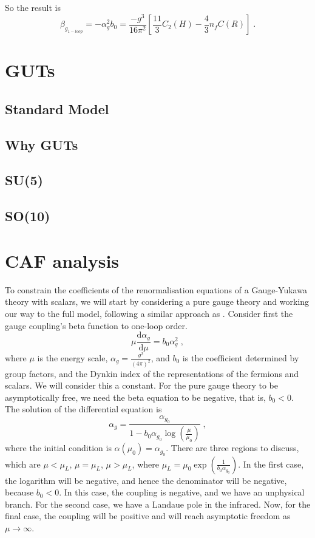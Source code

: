 So the result is
\begin{equation}
    \beta_{g_{1-loop}}=-\alpha_g^2 b_0 =\frac{-g^3}{16\pi^2}\left[ \frac{11}{3}C_2(H)-\frac{4}{3}n_fC(R)\right]\;.\label{eq:betafunction YM 1loop}
\end{equation}

\section{GUTs}
\subsection{Standard Model}
\subsection{Why GUTs}
\subsection{SU(5)}
\subsection{SO(10)}

\section{CAF analysis}
To constrain the coefficients of the renormalisation equations of a Gauge-Yukawa theory with scalars, we will start by considering a pure gauge theory and working our way to the full model, following a similar approach as \cite{Pica2017ConformalPhase}.  
Consider first the gauge coupling's beta function to one-loop order. 
\begin{equation}
    \mu \frac{\text{d}\alpha_g}{\text{d}\mu}=b_0\alpha_g^2\;,\label{eq:betag1loop}
\end{equation}
where $\mu$ is the energy scale, $\alpha_g=\frac{g^2}{(4\pi)^2}$, and $b_0$ is the coefficient determined by group factors, and the Dynkin index of the representations of the fermions and scalars. We will consider this a constant. For the pure gauge theory to be asymptotically free, we need the beta equation to be negative, that is, $b_0<0$. The solution of the differential equation is
\begin{equation}
    \alpha_g=\frac{\alpha_{g_0}}{1-b_0 \alpha_{g_0} \log \left(\frac{\mu}{\mu_0 }\right)}\;,
    \label{eq:solbetag1loop}
\end{equation}
where the initial condition is $\alpha(\mu_0)=\alpha_{g_0}$. There are three regions to discuss, which are $\mu<\mu_L$, $\mu=\mu_L$, $\mu>\mu_L$, where $\mu_L=\mu_0\exp(\frac1{b_0\alpha_{g_0}})$. In the first case, the logarithm will be negative, and hence the denominator will be negative, because $b_0<0$. In this case, the coupling is negative, and we have an unphysical branch. For the second case, we have a Landaue pole in the infrared. Now, for the final case, the coupling will be positive and will reach asymptotic freedom as $\mu\to\infty$.


